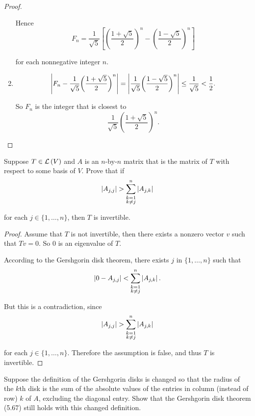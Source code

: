 \begin{proof}
\begin{enumerate}[label={(\alph*)}]
              Hence
              \[
                  F_{n} = \frac{1}{\sqrt{5}}\left[{\left(\frac{1 + \sqrt{5}}{2}\right)}^{n} - {\left(\frac{1 - \sqrt{5}}{2}\right)}^{n}\right]
              \]

              for each nonnegative integer $n$.
        \item \[
                  \left\vert{F_{n} - \frac{1}{\sqrt{5}}{\left(\frac{1 + \sqrt{5}}{2}\right)}^{n}}\right\vert = \left\vert{\frac{1}{\sqrt{5}}{\left(\frac{1 - \sqrt{5}}{2}\right)}^{n}}\right\vert\leq \frac{1}{\sqrt{5}} < \frac{1}{2}.
              \]

              So $F_{n}$ is the integer that is closest to
              \[
                  \frac{1}{\sqrt{5}}{\left(\frac{1 + \sqrt{5}}{2}\right)}^{n}.
              \]
    \end{enumerate}
\end{proof}
\newpage

\begin{exercise}
    Suppose $T\in\mathcal{L}\left({V}\right)$ and $A$ is an $n$-by-$n$ matrix that is the matrix of $T$ with respect to some basis of $V$. Prove that if
    \[
        \left\vert{A_{j,j}}\right\vert > \sum^{n}_{\substack{k=1\\ k\ne j}}\left\vert{A_{j,k}}\right\vert
    \]

    for each $j\in \{ 1, \ldots, n \}$, then $T$ is invertible.
\end{exercise}

\begin{proof}
    Assume that $T$ is not invertible, then there exists a nonzero vector $v$ such that $Tv = 0$. So $0$ is an eigenvalue of $T$.

    According to the Gershgorin disk theorem, there exists $j$ in $\{ 1, \ldots, n \}$ such that
    \[
        \left\vert{0 - A_{j,j}}\right\vert < \sum^{n}_{\substack{k=1 \\ k\ne j}}\left\vert{A_{j,k}}\right\vert.
    \]

    But this is a contradiction, since
    \[
        \left\vert{A_{j,j}}\right\vert > \sum^{n}_{\substack{k=1\\ k\ne j}}\left\vert{A_{j,k}}\right\vert
    \]

    for each $j\in \{ 1, \ldots, n \}$. Therefore the assumption is false, and thus $T$ is invertible.
\end{proof}
\newpage

\begin{exercise}
    Suppose the definition of the Gershgorin disks is changed so that the radius of the $k$th disk is the sum of the absolute values of the entries in column (instead of row) $k$ of $A$, excluding the diagonal entry. Show that the Gershgorin disk theorem (5.67) still holds with this changed definition.
\end{exercise}

